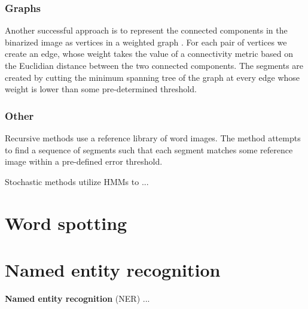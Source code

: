 \subsubsection{Graphs}

Another successful approach is to represent the connected components in the binarized image as vertices in a weighted graph \cite{GraphSegmentation}.
For each pair of vertices we create an edge, whose weight takes the value of a connectivity metric based on the Euclidian distance between the two connected components.
The segments are created by cutting the minimum spanning tree of the graph at every edge whose weight is lower than some pre-determined threshold.

\subsubsection{Other}

Recursive methods use a reference library of word images.
The method attempts to find a sequence of segments such that each segment matches some reference image within a pre-defined error threshold.

Stochastic methods utilize HMMs to ...



\section{Word spotting}


\section{Named entity recognition}

\textbf{Named entity recognition} (NER) ...
